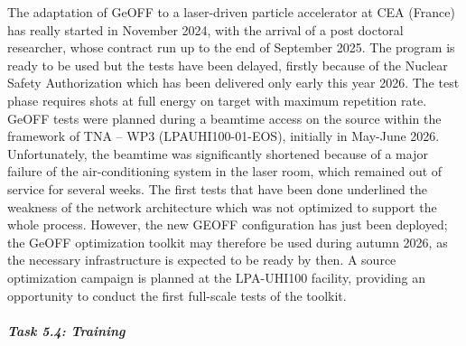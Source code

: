 The adaptation of GeOFF to a laser-driven particle accelerator at CEA (France) has really started in November 2024, with the arrival of 
a post doctoral researcher, whose contract run up to the end of September 2025. The program is ready to be used but the tests have been delayed, firstly because of the Nuclear Safety Authorization which has been delivered only early this year 2026. The test phase requires shots at full energy on target with maximum repetition rate. 
GeOFF tests were planned during a beamtime access on the source within the framework of TNA – WP3 (LPAUHI100-01-EOS), initially in May-June 2026. Unfortunately, the beamtime was significantly shortened because of a major failure of the air-conditioning system in the laser room, which remained out of service for several weeks. The first tests that have been done underlined the weakness of the network architecture which was not optimized to support the whole process. However, the new GEOFF configuration has just been deployed; the GeOFF optimization toolkit may therefore be used during autumn 2026, as the necessary infrastructure is expected to be ready by then. A source optimization campaign is planned at the LPA-UHI100 facility, providing an opportunity to conduct the first full-scale tests of the toolkit.


\subparagraph{Task 5.4: Training} \mbox{}


